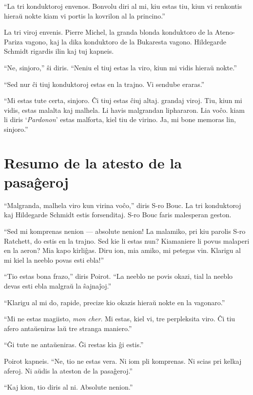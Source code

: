 ``La tri konduktoroj envenos. Bonvolu diri al mi, kiu estas tiu, kiun vi renkontis hieraŭ nokte kiam vi portis la kovrilon al la princino.''

La tri viroj envenis. Pierre Michel, la granda blonda konduktoro de la Ateno-Pariza vagono, kaj la dika konduktoro de la Bukaresta vagono. Hildegarde Schmidt rigardis ilin kaj tuj kapneis.

``Ne, sinjoro,'' ŝi diris. ``Neniu el tiuj estas la viro, kiun mi vidis hieraŭ nokte.''

``Sed nur ĉi tiuj konduktoroj estas en la trajno. Vi sendube eraras.''

``Mi estas tute certa, sinjoro. Ĉi tiuj estas ĉiuj altaj. grandaj viroj. Tiu, kiun mi vidis, estas malalta kaj malhela. Li havis malgrandan liphararon. Lia voĉo. kiam li diris `\emph{Pardonon}' estas malforta, kiel tiu de virino. Ja, mi bone memoras lin, sinjoro.''

\chapter[Resumo de la atesto de la pasaĝeroj]{Resumo de la atesto de la pasaĝeroj}


``Malgranda, malhela viro kun virina voĉo,'' diris S-ro Bouc. La tri konduktoroj kaj Hildegarde Schmidt estis forsenditaj. S-ro Bouc faris malesperan geston.

``Sed mi komprenas nenion --- absolute nenion! La malamiko, pri kiu parolis S-ro Ratchett, do estis en la trajno. Sed kie li estas nun? Kiamaniere li povus malaperi en la aeron? Mia kapo kirliĝas. Diru ion, mia amiko, mi petegas vin. Klarigu al mi kiel la neeblo povas esti ebla!''

``Tio estas bona frazo,'' diris Poirot. ``La neeblo ne povis okazi, tial la neeblo devas esti ebla malgraŭ la ŝajnaĵoj.''

``Klarigu al mi do, rapide, precize kio okazis hieraŭ nokte en la vagonaro.''

``Mi ne estas magiisto, \emph{mon cher}. Mi estas, kiel vi, tre perpleksita viro. Ĉi tiu afero antaŭeniras laŭ tre stranga maniero.''

``Ĝi tute ne antaŭeniras. Ĝi restas kia ĝi estis.''

Poirot kapneis. ``Ne, tio ne estas vera. Ni iom pli komprenas. Ni scias pri kelkaj aferoj. Ni aŭdis la ateston de la pasaĝeroj.''

``Kaj kion, tio diris al ni. Absolute nenion.''

